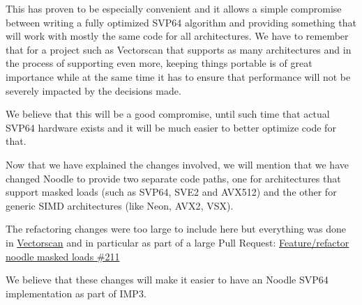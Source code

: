 This has proven to be especially convenient and it allows a simple compromise between writing a fully optimized \acrshort{SVP64} algorithm
and providing something that will work with mostly the same code for all architectures.
We have to remember that for a project such as Vectorscan that supports as many architectures
and in the process of supporting even more, keeping things portable is of great importance
while at the same time it has to ensure that performance will not be severely impacted by the decisions made.
\par

We believe that this will be a good compromise,
until such time that actual \acrshort{SVP64} hardware exists and it will be much easier to better optimize code for that.
\par

Now that we have explained the changes involved, we will mention that we have changed Noodle to provide two separate code paths,
one for architectures that support masked loads (such as \acrshort{SVP64}, \acrshort{SVE2} and \acrshort{AVX512})
and the other for generic \acrshort{SIMD} architectures (like Neon, \acrshort{AVX2}, \acrshort{VSX}).
\par

The refactoring changes were too large to include here
but everything was done in \href{https://github.com/VectorCamp/vectorscan}{Vectorscan} and in particular as part of a large Pull Request:
\href{https://github.com/VectorCamp/vectorscan/pull/211}{Feature/refactor noodle masked loads \#211}
\par

We believe that these changes will make it easier to have an Noodle \acrshort{SVP64} implementation as part of \acrshort{IMP}3.
\par
